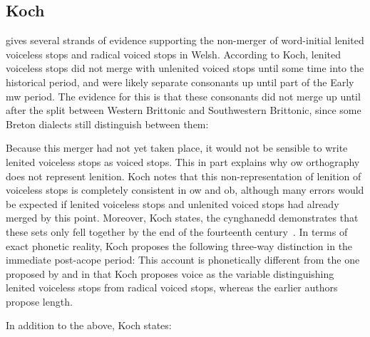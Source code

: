 \subsection{Koch}
\label{kochvoiceless}
\Textcite{koch_*cothairche_1990} gives several strands of evidence supporting the non-merger of word-initial lenited voiceless stops and radical voiced stops in Welsh. According to Koch, lenited voiceless stops did not merge with unlenited voiced stops until some time into the historical period, and were likely separate consonants up until part of the Early \gls{mw} period. The evidence for this is that these consonants did not merge up until after the split between Western Brittonic and Southwestern Brittonic, since some Breton dialects still distinguish between them: 
 
Because this merger had not yet taken place, it would not be sensible to write lenited voiceless stops as voiced stops. This in part explains why \gls{ow} orthography does not represent lenition. Koch notes that this non-representation of lenition of voiceless stops is completely consistent in \gls{ow} and \gls{ob}, although many errors would be expected if lenited voiceless stops and unlenited voiced stops had already merged by this point. Moreover, Koch states, the cynghanedd demonstrates that these sets only fell together by the end of the fourteenth century~\parencite[\S26]{koch_*cothairche_1990}. In terms of exact phonetic reality, Koch proposes the following three-way distinction in the immediate post-acope period:  This account is phonetically different from the one proposed by \textcite{falchun_systeme_1951} and \textcite{jackson_language_1953} in that Koch proposes voice as the variable distinguishing lenited voiceless stops from radical voiced stops, whereas the earlier authors propose length. 

In addition to the above, Koch states:

